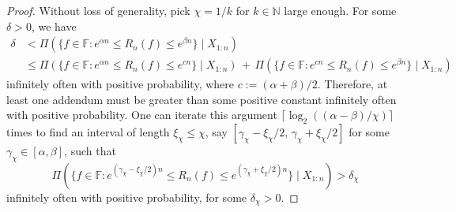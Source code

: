 \documentclass[11pt,twoside]{article}
\def\NN{\mathbb{N}}
\def\FF{\mathbb{F}}
\def\FF{\mathbb{F}}
\begin{document}
\begin{proof}
    Without loss of generality, pick $\chi=1/k$ for $k\in\NN$ large enough. For some $\delta>0$, we have
    \begin{align*}
        \delta & < \Pi(\{f\in\FF : e^{\alpha n}\leq R_n(f)\leq e^{\beta n}\}\mid X_{1:n}) \\
        & \leq   \Pi(\{f\in\FF : e^{\alpha n}\leq R_n(f)\leq e^{cn}\}\mid X_{1:n}) \, + \, \Pi(\{f\in\FF : e^{cn}\leq R_n(f)\leq e^{\beta n}\}\mid X_{1:n})
    \end{align*}
    infinitely often with positive probability, where $c:=(\alpha+\beta)/2$. Therefore, at least one addendum must be greater than some positive constant infinitely often with positive probability. One can iterate this argument $\lceil\log_2((\alpha-\beta)/\chi)\rceil$ times to find an interval of length $\xi_\chi\leq \chi$, say $[\gamma_\chi - \xi_\chi/2,\, \gamma_\chi+\xi_\chi/2]$ for some $\gamma_\chi\in[\alpha,\beta]$, such that
    \begin{equation*}
        \Pi(\{f\in\FF : e^{(\gamma_\chi - \xi_\chi/2) n}\leq R_n(f)\leq e^{(\gamma_\chi+\xi_\chi/2) n}\}\mid X_{1:n}) > \delta_\chi
    \end{equation*}
    infinitely often with positive probability, for some $\delta_\chi>0$.


\end{proof}
\end{document}
